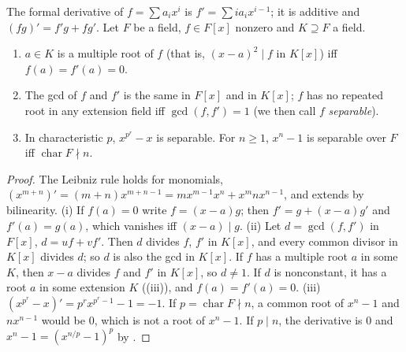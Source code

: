 \begin{proposition}\label{prop:rings:derivative}
The formal derivative of $f=\sum a_ix^i$ is $f'=\sum ia_ix^{i-1}$; it is additive and $(fg)'=f'g+fg'$. Let $F$ be a field, $f\in F[x]$ nonzero and
$K\supseteq F$ a field.
\begin{enumerate}[label=(\roman*)]
\item $a\in K$ is a multiple root of $f$ (that is, $(x-a)^2\mid f$ in $K[x]$) iff $f(a)=f'(a)=0$.
\item The gcd of $f$ and $f'$ is the same in $F[x]$ and in $K[x]$; $f$ has no repeated root in any extension field iff $\gcd(f,f')=1$
(we then call $f$ \emph{separable}).
\item In characteristic $p$, $x^{p^r}-x$ is separable. For $n\ge1$, $x^n-1$ is separable over $F$ iff $\operatorname{char}F\nmid n$.
\end{enumerate}
\end{proposition}

\begin{proof}
The Leibniz rule holds for monomials, $(x^{m+n})'=(m+n)x^{m+n-1}=mx^{m-1}x^n+x^mnx^{n-1}$, and extends by bilinearity.
(i) If $f(a)=0$ write $f=(x-a)g$; then $f'=g+(x-a)g'$ and $f'(a)=g(a)$, which vanishes iff $(x-a)\mid g$.
(ii) Let $d=\gcd(f,f')$ in $F[x]$, $d=uf+vf'$. Then $d$ divides $f$, $f'$ in $K[x]$, and every common divisor in $K[x]$ divides $d$; so $d$ is
also the gcd in $K[x]$. If $f$ has a multiple root $a$ in some $K$, then $x-a$ divides $f$ and $f'$ in $K[x]$, so $d\ne1$. If $d$ is
nonconstant, it has a root $a$ in some extension $K$ ((iii)), and $f(a)=f'(a)=0$.
(iii) $(x^{p^r}-x)'=p^rx^{p^r-1}-1=-1$. If $p=\operatorname{char}F\nmid n$, a common root of $x^n-1$ and $nx^{n-1}$ would be $0$, which is not a root of
$x^n-1$. If $p\mid n$, the derivative is $0$ and $x^n-1=(x^{n/p}-1)^p$ by .
\end{proof}

